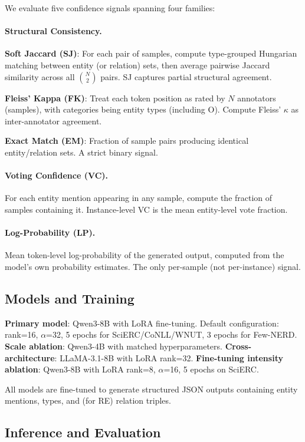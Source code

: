 \documentclass[11pt,a4paper]{article}
\begin{document}
We evaluate five confidence signals spanning four families:

\paragraph{Structural Consistency.}
\textbf{Soft Jaccard (SJ)}: For each pair of samples, compute type-grouped Hungarian matching between entity (or relation) sets, then average pairwise Jaccard similarity across all $\binom{N}{2}$ pairs.
SJ captures partial structural agreement.

\textbf{Fleiss' Kappa (FK)}: Treat each token position as rated by $N$ annotators (samples), with categories being entity types (including O). Compute Fleiss' $\kappa$ as inter-annotator agreement.

\textbf{Exact Match (EM)}: Fraction of sample pairs producing identical entity/relation sets. A strict binary signal.

\paragraph{Voting Confidence (VC).}
For each entity mention appearing in any sample, compute the fraction of samples containing it. Instance-level VC is the mean entity-level vote fraction.

\paragraph{Log-Probability (LP).}
Mean token-level log-probability of the generated output, computed from the model's own probability estimates. The only per-sample (not per-instance) signal.

\subsection{Models and Training}

\textbf{Primary model}: Qwen3-8B with LoRA fine-tuning. Default configuration: rank=16, $\alpha$=32, 5 epochs for SciERC/CoNLL/WNUT, 3 epochs for Few-NERD.
\textbf{Scale ablation}: Qwen3-4B with matched hyperparameters.
\textbf{Cross-architecture}: LLaMA-3.1-8B with LoRA rank=32.
\textbf{Fine-tuning intensity ablation}: Qwen3-8B with LoRA rank=8, $\alpha$=16, 5 epochs on SciERC.

All models are fine-tuned to generate structured JSON outputs containing entity mentions, types, and (for RE) relation triples.

\subsection{Inference and Evaluation}
\label{sec:eval}
\end{document}
